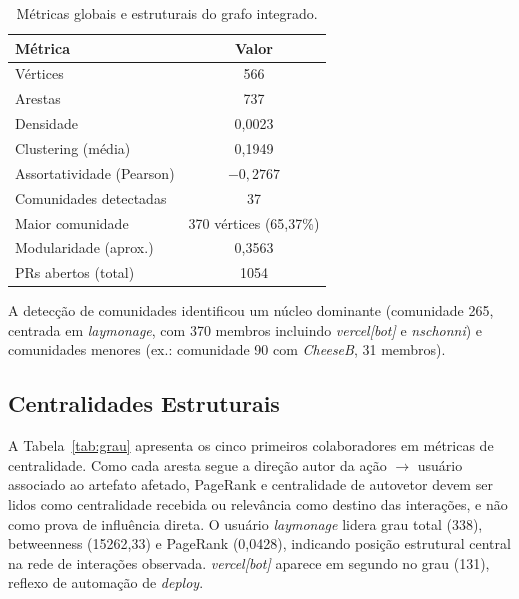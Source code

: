 \documentclass[12pt]{article}
\begin{document}
\begin{table}[H]
\centering
\caption{Métricas globais e estruturais do grafo integrado.}
\small
\begin{tabular}{|l|c|}
\hline
\textbf{Métrica} & \textbf{Valor} \\
\hline Vértices & 566 \\
\hline Arestas & 737 \\
\hline Densidade & 0,0023 \\
\hline Clustering (média) & 0,1949 \\
\hline Assortatividade (Pearson) & $-0{,}2767$ \\
\hline Comunidades detectadas & 37 \\
\hline Maior comunidade & 370 vértices (65,37\%) \\
\hline Modularidade (aprox.) & 0,3563 \\
\hline PRs abertos (total) & 1054 \\
\hline
\end{tabular}
\label{tab:estrutura}
\end{table}

A detecção de comunidades identificou um núcleo dominante (comunidade 265, centrada em \textit{laymonage}, com 370 membros incluindo \textit{vercel[bot]} e \textit{nschonni}) e comunidades menores (ex.: comunidade 90 com \textit{CheeseB}, 31 membros).

\subsection{Centralidades Estruturais}

A Tabela~\ref{tab:grau} apresenta os cinco primeiros colaboradores em métricas de centralidade. Como cada aresta segue a direção autor da ação $\rightarrow$ usuário associado ao artefato afetado, PageRank e centralidade de autovetor devem ser lidos como centralidade recebida ou relevância como destino das interações, e não como prova de influência direta. O usuário \textit{laymonage} lidera grau total (338), betweenness (15262,33) e PageRank (0,0428), indicando posição estrutural central na rede de interações observada. \textit{vercel[bot]} aparece em segundo no grau (131), reflexo de automação de \textit{deploy}.
\end{document}
